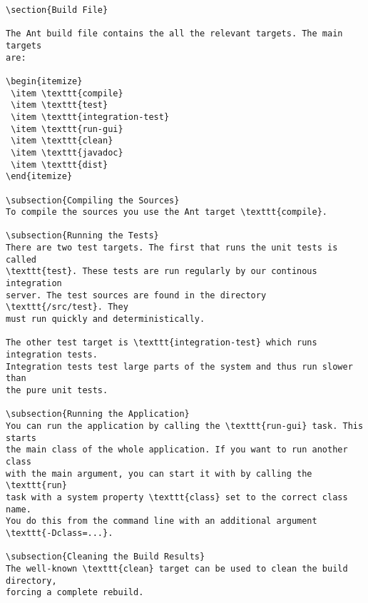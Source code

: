 \documentclass[11pt,a4paper]{article}
\begin{document}
{\begin{verbatim}
\section{Build File}

The Ant build file contains the all the relevant targets. The main targets
are:

\begin{itemize}
 \item \texttt{compile}
 \item \texttt{test}
 \item \texttt{integration-test}
 \item \texttt{run-gui}
 \item \texttt{clean}
 \item \texttt{javadoc}
 \item \texttt{dist}
\end{itemize}

\subsection{Compiling the Sources}
To compile the sources you use the Ant target \texttt{compile}. 

\subsection{Running the Tests}
There are two test targets. The first that runs the unit tests is called
\texttt{test}. These tests are run regularly by our continous integration
server. The test sources are found in the directory \texttt{/src/test}. They
must run quickly and deterministically.

The other test target is \texttt{integration-test} which runs integration tests.
Integration tests test large parts of the system and thus run slower than
the pure unit tests.

\subsection{Running the Application}
You can run the application by calling the \texttt{run-gui} task. This starts
the main class of the whole application. If you want to run another class
with the main argument, you can start it with by calling the \texttt{run}
task with a system property \texttt{class} set to the correct class name.
You do this from the command line with an additional argument 
\texttt{-Dclass=...}.

\subsection{Cleaning the Build Results}
The well-known \texttt{clean} target can be used to clean the build directory,
forcing a complete rebuild.


\end{verbatim}}
\end{document}
